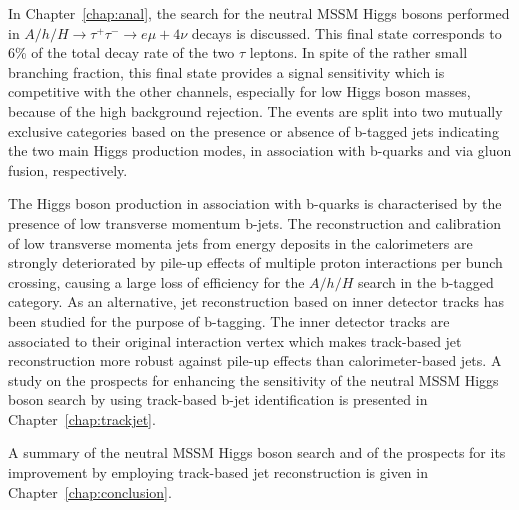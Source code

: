 In Chapter~\ref{chap:anal}, the search for the neutral MSSM Higgs bosons  performed 
in  $A/h/H \rightarrow \tau^+ \tau^- \rightarrow e\mu + 4\nu$ decays is discussed.
This final state corresponds to 6\% of the total decay rate of the two $\tau$ leptons. 
In spite of the  rather small branching fraction, this final state provides a signal 
sensitivity which is competitive with the other channels, especially
for low Higgs boson masses, because of the high background rejection.
The  events are split into two mutually exclusive categories based on the presence or
absence of b-tagged jets indicating the two main Higgs production modes,
in association with b-quarks and via gluon fusion, respectively.

The Higgs boson production in association with b-quarks is characterised by the presence of low 
transverse momentum b-jets.
The reconstruction and calibration of low transverse momenta jets from energy deposits in the calorimeters are strongly 
deteriorated by pile-up effects of multiple proton interactions per bunch crossing, causing a large loss of efficiency for the $A/h/H$ search
in the b-tagged category. As an alternative, jet reconstruction based on inner detector 
tracks has been studied for the purpose of b-tagging.
The inner detector tracks are associated to their original interaction vertex which 
makes track-based jet reconstruction more robust against pile-up effects than calorimeter-based jets. 
A study on the prospects for enhancing the sensitivity of the neutral MSSM 
Higgs boson search  by using track-based b-jet identification is presented in Chapter~\ref{chap:trackjet}.

A summary of the neutral MSSM Higgs boson search and of the prospects for its improvement by employing track-based jet reconstruction
is given in Chapter~\ref{chap:conclusion}.











